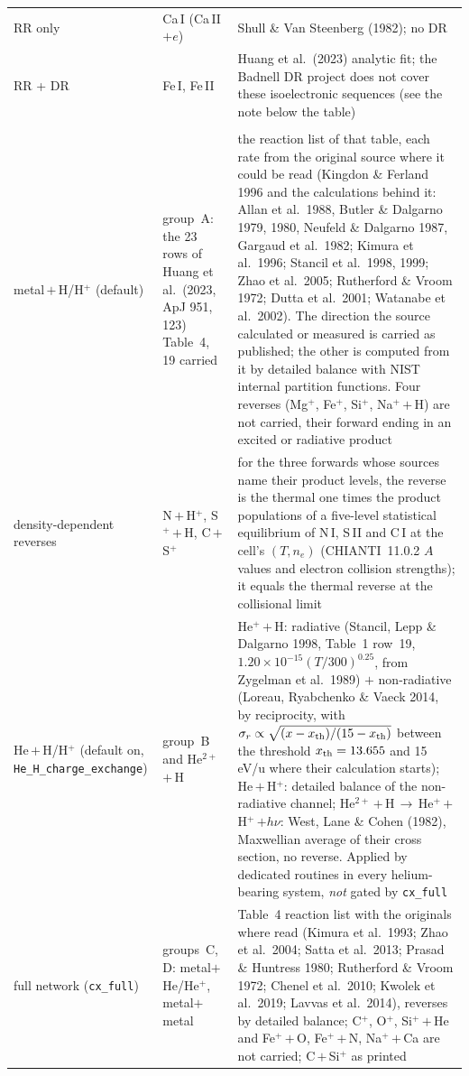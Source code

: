 \documentclass[english,a4paper]{my_memo}
\begin{document}
\begin{longtable}{@{}>{\raggedright\arraybackslash\hyphenpenalty=10000\exhyphenpenalty=10000}p{}p{}p{}@{}}
RR only & Ca\,I (Ca\,II$+e$) & Shull \& Van Steenberg (1982); no DR \\
RR + DR & Fe\,I, Fe\,II & Huang et al.\ (2023) analytic fit; the Badnell DR project does not cover these isoelectronic sequences (see the note below the table) \\
\midrule
\multicolumn{3}{@{}l}{\textbf{Charge exchange (charge transfer)}}\\[2pt]
metal\,$+$\,H/H$^+$ (default) & group~A: the 23 rows of Huang et al.\ (2023, ApJ 951, 123) Table~4, 19 carried & the reaction list of that table, each rate from the original source where it could be read (Kingdon \& Ferland 1996 and the calculations behind it: Allan et al.\ 1988, Butler \& Dalgarno 1979, 1980, Neufeld \& Dalgarno 1987, Gargaud et al.\ 1982; Kimura et al.\ 1996; Stancil et al.\ 1998, 1999; Zhao et al.\ 2005; Rutherford \& Vroom 1972; Dutta et al.\ 2001; Watanabe et al.\ 2002). The direction the source calculated or measured is carried as published; the other is computed from it by detailed balance with NIST internal partition functions. Four reverses (Mg$^+$, Fe$^+$, Si$^+$, Na$^+$\,$+$\,H) are not carried, their forward ending in an excited or radiative product \\
density-dependent reverses & N\,$+$\,H$^+$, S$^+$\,$+$\,H, C\,$+$\,S$^+$ & for the three forwards whose sources name their product levels, the reverse is the thermal one times the product populations of a five-level statistical equilibrium of N\,I, S\,II and C\,I at the cell's $(T,n_e)$ (CHIANTI~11.0.2 $A$ values and electron collision strengths); it equals the thermal reverse at the collisional limit \\
He\,$+$\,H/H$^+$ (default on, \texttt{He\_H\_charge\_}\allowbreak\texttt{exchange}) & group~B and He$^{2+}$\,$+$\,H & He$^+$\,$+$\,H: radiative (Stancil, Lepp \& Dalgarno 1998, Table~1 row~19, $1.20\times10^{-15}(T/300)^{0.25}$, from Zygelman et al.\ 1989) $+$ non-radiative (Loreau, Ryabchenko \& Vaeck 2014, by reciprocity, with $\sigma_r\propto\sqrt{(x-x_{\rm th})/(15-x_{\rm th})}$ between the threshold $x_{\rm th}=13.655$ and 15\,eV/u where their calculation starts); He\,$+$\,H$^+$: detailed balance of the non-radiative channel; He$^{2+}$\,$+$\,H\,$\to$\,He$^+$\,$+$\,H$^+$\,$+h\nu$: West, Lane \& Cohen (1982), Maxwellian average of their cross section, no reverse. Applied by dedicated routines in every helium-bearing system, \emph{not} gated by \texttt{cx\_full} \\
full network (\texttt{cx\_full}) & groups~C, D: metal$+$He/He$^+$, metal$+$metal & Table~4 reaction list with the originals where read (Kimura et al.\ 1993; Zhao et al.\ 2004; Satta et al.\ 2013; Prasad \& Huntress 1980; Rutherford \& Vroom 1972; Chenel et al.\ 2010; Kwolek et al.\ 2019; Lavvas et al.\ 2014), reverses by detailed balance; C$^+$, O$^+$, Si$^+$\,$+$\,He and Fe$^+$\,$+$\,O, Fe$^+$\,$+$\,N, Na$^+$\,$+$\,Ca are not carried; C\,$+$\,Si$^+$ as printed \\

\end{longtable}
\end{document}
